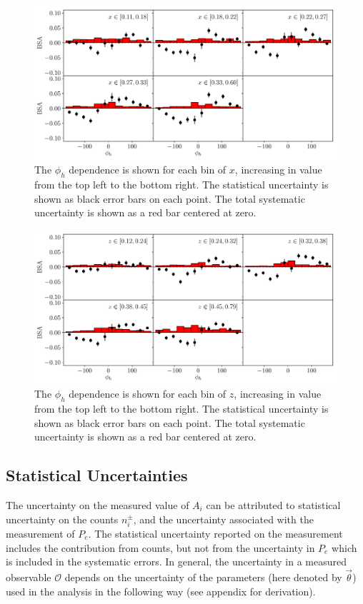 \begin{figure}
	\centering
	\label{fig:bsa-sys-x}
	\includegraphics[width = \textwidth]{image/plots/kaon-bsa/grid_bsa_sys_x.pdf}
	\caption{The $\phi_h$ dependence is shown for each bin of $x$, increasing in value from the top left to the bottom right.  The statistical uncertainty is shown as black error bars on each point.  The total systematic uncertainty is shown as a red bar centered at zero.}
\end{figure}

\begin{figure}
	\centering
	\label{fig:bsa-sys-z}
	\includegraphics[width = \textwidth]{image/plots/kaon-bsa/grid_bsa_sys_z.pdf}
	\caption{The $\phi_h$ dependence is shown for each bin of $z$, increasing in value from the top left to the bottom right.  The statistical uncertainty is shown as black error bars on each point.  The total systematic uncertainty is shown as a red bar centered at zero.}
\end{figure}

\subsection{Statistical Uncertainties}
The uncertainty on the measured value of $A_i$ can be attributed to statistical uncertainty on the counts $n_{i}^{\pm}$, and the uncertainty associated with the measurement of $P_e$.  The statistical uncertainty reported on the measurement includes the contribution from counts, but not from the uncertainty in $P_e$ which is included in the systematic errors.  In general, the uncertainty in a measured observable $\mathcal{O}$ depends on the uncertainty of the parameters (here denoted by $\vec{\theta}$) used in the analysis in the following way (see appendix for derivation).

